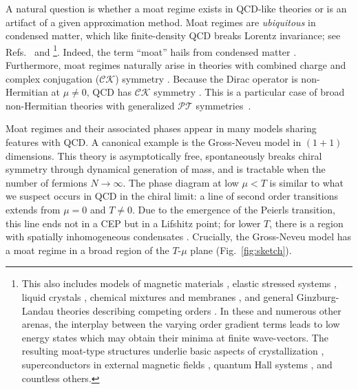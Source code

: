 \documentclass[twocolumn,prd,superscriptaddress, colorlinks, linkcolor=refcol, citecolor=refcol, urlcolor=refcol]{revtex4-2}
\begin{document}
A natural question is whether 
a moat regime exists in QCD-like theories or
is an artifact of a given approximation method.
Moat regimes  are {\it ubiquitous}
in condensed matter, which like finite-density QCD breaks Lorentz invariance;
see Refs.~\cite{Yoshimori,Hornnerich,Seul,modulation1,modulation2} 
and \footnote{This also includes  
models of magnetic materials \cite{Seul,Yoshimori,Hornnerich,Selke}, elastic stressed systems \cite{Amnon}, liquid crystals \cite{Elihu,LC2}, chemical mixtures and membranes \cite{Seul}, and general Ginzburg-Landau theories describing competing 
orders \cite{compete_GL}. In these and numerous other arenas, the interplay between the varying order gradient terms leads to low energy states which may obtain their minima at finite wave-vectors. The resulting moat-type structures underlie basic aspects of crystallization \cite{Braz,Braz2}, superconductors in external magnetic fields \cite{FFLO1,FFLO2,FFLO3}, quantum Hall systems \cite{qhstr2,QHE,fogler1,chalker,qhstr1, qhstr3,Pu2024}, and countless others.}.
Indeed, the term ``moat'' hails from condensed matter \cite{Pu2024,Sedrakyan14}.
Furthermore, moat regimes naturally arise
in theories with combined charge and complex conjugation ($\mathcal{CK}$) symmetry \cite{Schindler:2019ugo}.
Because the Dirac operator is non-Hermitian at $\mu \neq 0$,
QCD has $\mathcal{CK}$ symmetry \cite{Meisinger:2012va, Schindler:2021otf}.
This is a particular case of
broad non-Hermitian
theories with generalized $\mathcal{PT}$ 
symmetries~\cite{Bender:1998ke,Bender:2019cwm, Bender:2023cem}.

Moat regimes and their associated phases appear in many models sharing features with QCD. A canonical example is the Gross-Neveu model in $(1+1)$ dimensions. 
This theory is asymptotically free, spontaneously breaks chiral symmetry
through dynamical generation of mass, and is tractable when
the number of fermions $N \rightarrow \infty$.
The phase diagram at low $\mu < T$ is similar to what we suspect occurs in QCD in the chiral limit: 
a line of second order transitions extends
from $\mu = 0$ and $T \neq 0$.
Due to the emergence of the Peierls transition, 
this line ends not in a CEP but in a Lifshitz point; for lower $T$, there is a region with spatially inhomogeneous condensates \cite{Thies:2003kk,Basar:2008ki,Basar:2009fg,Lenz:2020bxk,Lenz:2021kzo, Lenz:2021vdz, Nonaka:2021pwm,Pannullo:2023cat,Koenigstein:2023yzv}.  
Crucially, the Gross-Neveu model has a moat regime
in a broad region of the $T$-$\mu$ plane \cite{Koenigstein:2021llr} 
(Fig.\ \ref{fig:sketch}).
\end{document}
